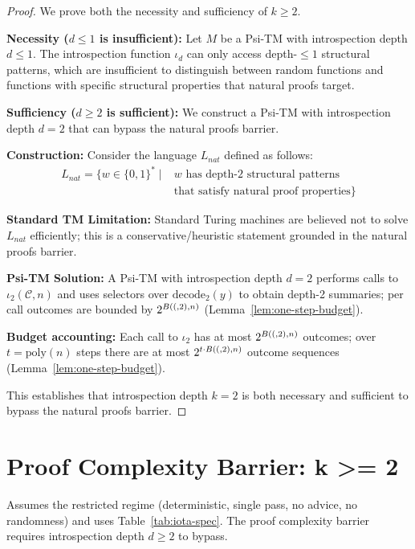 \begin{proof}
We prove both the necessity and sufficiency of $k \geq 2$.

\textbf{Necessity ($d \le 1$ is insufficient):}
Let $M$ be a Psi-TM with introspection depth $d \leq 1$. The introspection function $\iota_d$ can only access depth-$\leq 1$ structural patterns, which are insufficient to distinguish between random functions and functions with specific structural properties that natural proofs target.

\textbf{Sufficiency ($d \ge 2$ is sufficient):}
We construct a Psi-TM with introspection depth $d = 2$ that can bypass the natural proofs barrier.

\textbf{Construction:}
Consider the language $L_{nat}$ defined as follows:
\begin{align}
L_{nat} = \{w \in \{0,1\}^* \mid &\text{$w$ has depth-2 structural patterns} \nonumber \\
&\text{that satisfy natural proof properties}\}
\end{align}

\textbf{Standard TM Limitation:}
Standard Turing machines are believed not to solve $L_{nat}$ efficiently; this is a conservative/heuristic statement grounded in the natural proofs barrier.

\textbf{Psi-TM Solution:}
A Psi-TM with introspection depth $d = 2$ performs calls to $\iota_2(\mathcal{C},n)$ and uses selectors over $\mathrm{decode}_2(y)$ to obtain depth-2 summaries; per call outcomes are bounded by $2^{B((,2),n)}$ (Lemma~\ref{lem:one-step-budget}).

\textbf{Budget accounting:}
Each call to $\iota_2$ has at most $2^{B((,2),n)}$ outcomes; over $t=\mathrm{poly}(n)$ steps there are at most $2^{t\cdot B((,2),n)}$ outcome sequences (Lemma~\ref{lem:one-step-budget}).

This establishes that introspection depth $k = 2$ is both necessary and sufficient to bypass the natural proofs barrier.
\end{proof}

\section{Proof Complexity Barrier: k >= 2}

\begin{theorem}
Assumes the restricted regime (deterministic, single pass, no advice, no randomness) and uses Table~\ref{tab:iota-spec}.
The proof complexity barrier requires introspection depth $d \geq 2$ to bypass.
\end{theorem}

